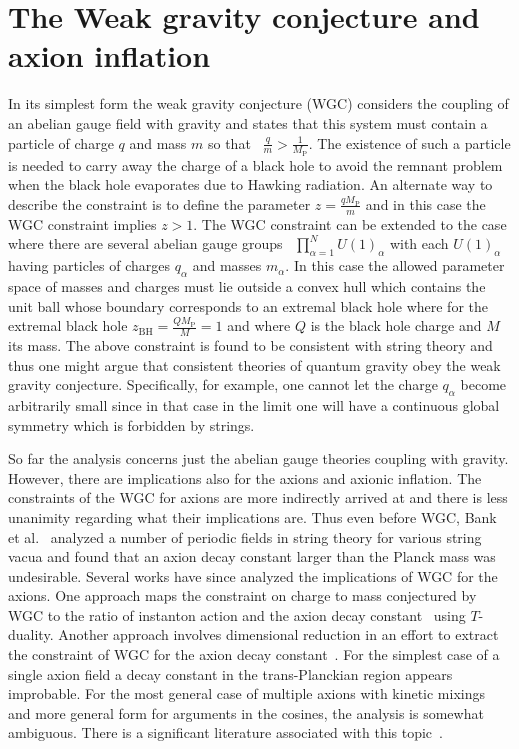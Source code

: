 \documentclass[12pt]{article}
\begin{document}
\section{The Weak gravity conjecture and axion inflation \label{sec:WeakGravityConjecture}}
In its simplest form the weak gravity conjecture (WGC) considers the coupling of an abelian gauge field with gravity and states that this system must contain a particle of charge $q$ and mass $m$ so that~\cite{ArkaniHamed:2006dz} $\frac{q}{m} > \frac{1}{M_\text{P}}$.
The existence of such a particle is needed to carry away the charge of a black hole to avoid the remnant problem when the black hole evaporates due to Hawking radiation.
An alternate way to describe the constraint is to define the parameter $z = \frac{q M_\text{P}}{m}$ and in this case the WGC constraint implies $z > 1$.
The WGC constraint can be extended to the case where there are several abelian gauge groups~\cite{Cheung:2014vva} $\prod_{\alpha = 1}^N U\left(1\right)_\alpha$ with each $U\left(1\right)_\alpha$ having particles of charges $q_\alpha$ and masses $m_\alpha$.
In this case the allowed parameter space of masses and charges must lie outside a convex hull which contains the unit ball whose boundary corresponds to an extremal black hole where for the extremal black hole $z_\text{BH} = \frac{Q M_\text{P}}{M} = 1$ and where $Q$ is the black hole charge and $M$ its mass.
The above constraint is found to be consistent with string theory and thus one might argue that consistent theories of quantum gravity obey the weak gravity conjecture.
Specifically, for example, one cannot let the charge $q_\alpha$ become arbitrarily small since in that case in the limit one will have a continuous global symmetry which is forbidden by strings.

So far the analysis concerns just the abelian gauge theories coupling with gravity.
However, there are implications also for the axions and axionic inflation.
The constraints of the WGC for axions are more indirectly arrived at and there is less unanimity regarding what their implications are.
Thus even before WGC, Bank et al.~\cite{Banks:2003sx} analyzed a number of periodic fields in string theory for various string vacua and found that an axion decay constant larger than the Planck mass was undesirable.
Several works have since analyzed the implications of WGC for the axions.
One approach maps the constraint on charge to mass conjectured by WGC to the ratio of instanton action and the axion decay constant~\cite{Brown:2015iha} using $T$-duality.
Another approach involves dimensional reduction in an effort to extract the constraint of WGC for the axion decay constant~\cite{Heidenreich:2015wga}.
For the simplest case of a single axion field a decay constant in the trans-Planckian region appears improbable.
For the most general case of multiple axions with kinetic mixings and more general form for arguments in the cosines, the analysis is somewhat ambiguous.
There is a significant literature associated with this topic~\cite{Rudelius:2015xta, Rudelius:2014wla, Bachlechner:2014gfa, Choi:2014rja, Hebecker:2015rya, Conlon:2016aea, Montero:2015ofa, Junghans:2015hba}.
\end{document}
